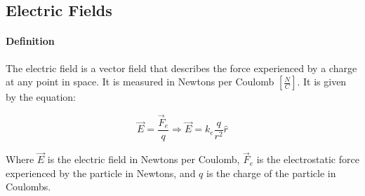 \subsection{Electric Fields}
\hrulefill

\paragraph*{Definition}
The electric field is a vector field that describes the force experienced by a charge at any point in space. 
It is measured in Newtons per Coulomb $[\frac{N}{C}]$. It is given by the equation:

\begin{equation*}
    \vec{E} = \frac{\vec{F}_e}{q} \Longrightarrow \vec E = k_e \frac{q}{r^2}\hat{r}
\end{equation*}

Where $\vec{E}$ is the electric field in Newtons per Coulomb, $\vec{F}_e$ is the electrostatic force experienced by the
particle in Newtons, and $q$ is the charge of the particle in Coulombs.\\


